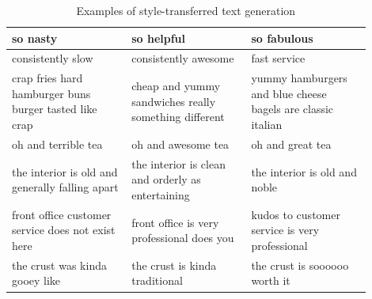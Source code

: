 \begin{table}[ht]
\begin{tabular}{| p{0.3\linewidth} | p{0.3\linewidth} | p{0.3\linewidth} |}
		\hline
		\hline
		so nasty                                               & so helpful                                                     & so fabulous                                                 \\
		\hline
		consistently slow                                      & consistently awesome                                           & fast service                                                \\
		\hline
		crap fries hard hamburger buns burger tasted like crap & cheap and yummy sandwiches really something different          & yummy hamburgers and blue cheese bagels are classic italian \\
		\hline
		oh and terrible tea                                    & oh and awesome tea                                             & oh and great tea                                            \\
		\hline
		the interior is old and generally falling apart        & the interior is clean and orderly as entertaining              & the interior is old and noble                               \\
		\hline
		front office customer service does not exist here      & front office is very professional does you                     & kudos to customer service is very professional              \\
		\hline
		the crust was kinda gooey like                         & the crust is kinda traditional                                 & the crust is soooooo worth it                               \\
		\hline
	\end{tabular}
	\caption{Examples of style-transferred text generation}
	\label{tab:transfer-samples}
\end{table}
